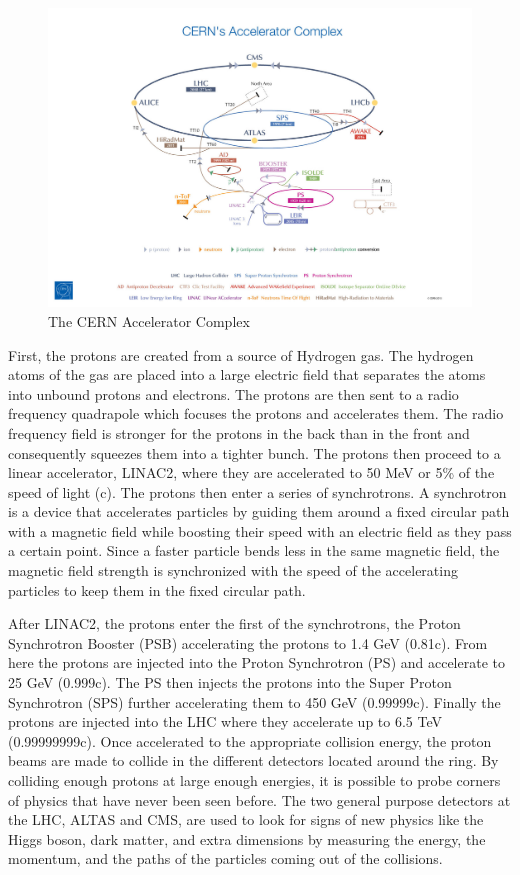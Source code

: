 \begin{figure}[h!]
  \centering
  \includegraphics[width=6in]{images/cern_accel_complex.png}
  \caption
   {The CERN Accelerator Complex \cite{cernaccelcomplex}}
  \label{fig:cernaccel}
\end{figure}

First, the protons are created from a source of Hydrogen gas. The hydrogen atoms of the gas are placed into a large electric field that separates the atoms into unbound protons and electrons. The protons are then sent to a radio frequency quadrapole which focuses the protons and accelerates them. The radio frequency field is stronger for the protons in the back than in the front and consequently squeezes them into a tighter bunch. The protons then proceed to a linear accelerator, LINAC2, where they are accelerated to 50 MeV or 5\% of the speed of light (c). The protons then enter a series of synchrotrons. A synchrotron is a device that accelerates particles by guiding them around a fixed circular path with a magnetic field while boosting their speed with an electric field as they pass a certain point. Since a faster particle bends less in the same magnetic field, the magnetic field strength is synchronized with the speed of the accelerating particles to keep them in the fixed circular path. 

After LINAC2, the protons enter the first of the synchrotrons, the Proton Synchrotron Booster (PSB) accelerating the protons to 1.4 GeV (0.81c). From here the protons are injected into the Proton Synchrotron (PS) and accelerate to 25 GeV (0.999c). The PS then injects the protons into the Super Proton Synchrotron (SPS) further accelerating them to 450 GeV (0.99999c). Finally the protons are injected into the LHC where they accelerate up to 6.5 TeV (0.99999999c). Once accelerated to the appropriate collision energy, the proton beams are made to collide in the different detectors located around the ring. By colliding enough protons at large enough energies, it is possible to probe corners of physics that have never been seen before. The two general purpose detectors at the LHC, ALTAS and CMS, are used to look for signs of new physics like the Higgs boson, dark matter, and extra dimensions by measuring the energy, the momentum, and the paths of the particles coming out of the collisions.

